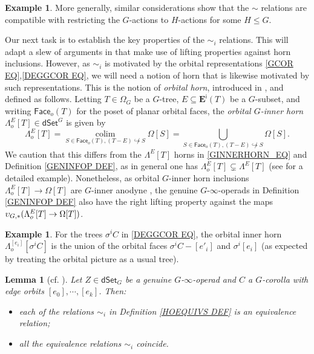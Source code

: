 \documentclass[a4paper,10pt
,draft
]{article}%
\numberwithin{equation}{section}
\numberwithin{figure}{section}
\newtheorem{lemma}[equation]{Lemma}%
\theoremstyle{definition} %
\newtheorem{example}[equation]{Example}%
\newcommand{\into}{\hookrightarrow}%
\DeclareMathOperator{\colim}{colim}%
\newcommand{\1}{\ensuremath{\mathbbm 1}}%
\begin{document}
\begin{example}
More generally, similar considerations show that the $\sim$ relations are compatible with restricting the $G$-actions
to $H$-actions for some $H \leq G$.
\end{example}


Our next task is to establish the key properties
of the $\sim_i$ relations.
This will adapt a slew of arguments in
\cite[\S 6]{MW09}
that make use of lifting properties against horn inclusions.
However, as $\sim_i$ is motivated by the
orbital representations \eqref{GCOR EQ},\eqref{DEGGCOR EQ},
we will need a notion of horn that is likewise motivated by
such representations.
This is the notion of \emph{orbital horn},
introduced in \cite[\S 2.3]{BP_edss},
and defined as follows.
Letting $T \in \Omega_G$ be a $G$-tree,
$E \subseteq \boldsymbol{E}^{\mathsf{i}}(T)$
be a $G$-subset,
and writing
$\mathsf{Face}_o(T)$
for the poset of planar orbital faces, 
the \emph{orbital $G$-inner horn} 
$\Lambda_o^E[T] \in \mathsf{dSet}^G$ is given by
\begin{equation}
        \label{ORBITALHORN_EQ}
        \Lambda_o^E[T]
        = \mathop{\colim}\limits_{S \in \mathsf{Face}_o(T), (T - E) \not\into S} \Omega[S]
        = \bigcup_{S \in \mathsf{Face}_o(T), (T - E) \not\into S} \Omega[S].
\end{equation}
We caution that this differs from 
the $\Lambda^E[T]$ horns in 
\eqref{GINNERHORN_EQ} and Definition \ref{GENINFOP DEF},
as in general one has
$\Lambda_o^E[T] \subsetneq \Lambda^E[T]$
(see \cite[Ex. 2.34]{BP_edss} for a detailed example).
Nonetheless, as orbital $G$-inner horn inclusions 
$\Lambda_o^E[T] \to \Omega[T]$
are $G$-inner anodyne \cite[Prop. 3.13]{BP_edss},
the genuine $G$-$\infty$-operads in
Definition \ref{GENINFOP DEF}
also have the right lifting property against the maps
$\upsilon_{G,\**}(\Lambda_o^E[T] \to \Omega[T])$.

\begin{example}
	For the trees $\sigma^i C$ in \eqref{DEGGCOR EQ},
	the orbital inner horn 
	$\Lambda_o^{[e_i]}[\sigma^i C]$
	is the union of the orbital faces 
	$\sigma^i C - [e'_i]$ and 
	$\sigma^i[e_i]$
	(as expected by treating the orbital
	picture as a usual tree).
\end{example}




\begin{lemma}[{cf. \cite[Prop. 6.3 and Lemma 6.4]{MW09}}]
	\label{EQUIVI LEM}
	Let $Z \in \mathsf{dSet}_G$ be a genuine $G$-$\infty$-operad and $C$ a $G$-corolla with edge orbits
	$[e_0],\cdots,[e_k]$. Then:
\begin{itemize}
	\item[(a)] each of the relations $\sim_i$ 
	in Definition \ref{HOEQUIVS DEF}
	is an equivalence relation;
	\item[(b)] all the equivalence relations $\sim_i$ coincide.
\end{itemize}
\end{lemma}
\end{document}
